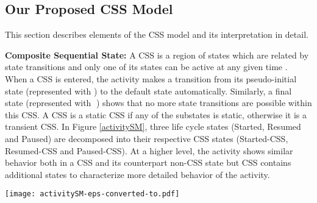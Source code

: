 \documentclass[10pt]{elsarticle}
\begin{document}
\newcommand*\mycircle{\textcircled{\textbullet}}

\newcommand\bulletarrow{{\ooalign{\raise0.01ex\hbox{\scalebox{2}{$\bullet$}}}}}


\subsection{Our Proposed CSS Model}  \label{cssModel}

This section describes elements of the CSS model and its interpretation in detail. 

{\noindent \bf Composite Sequential State:} A CSS is a region of states which are related by state transitions and only one of its states can be active at any given time \cite{BoochUML}. When a CSS is entered, the activity makes a transition from its pseudo-initial state (represented with \bulletarrow) to the default state automatically. Similarly, a final state (represented with \mycircle) shows that no more state transitions are possible within this CSS. A CSS is a static CSS if any of the substates is static, otherwise it is a transient CSS. In Figure \ref{activitySM}, three life cycle states (Started, Resumed and Paused) are decomposed into their respective CSS states (Started-CSS, Resumed-CSS and Paused-CSS). At a higher level, the activity shows similar behavior both in a CSS and its counterpart non-CSS state but CSS contains additional states to characterize more detailed behavior of the activity. 


\begin{comment}
\begin{figure*}
  \centering
  \epsfig{file=activitySM.eps, width=140mm}
  \caption{Composite Sequential State Model (The Reverse-engineered Activity Life Cycle Model)}
  \label{activitySM}
\end{figure*}
\end{comment}

\begin{figure*}
\centering
\texttt{[image: activitySM-eps-converted-to.pdf]}
\caption{Composite Sequential State Model (The Reverse-engineered Activity Life Cycle Model}
\label{activitySM}
\end{figure*}
\end{document}
